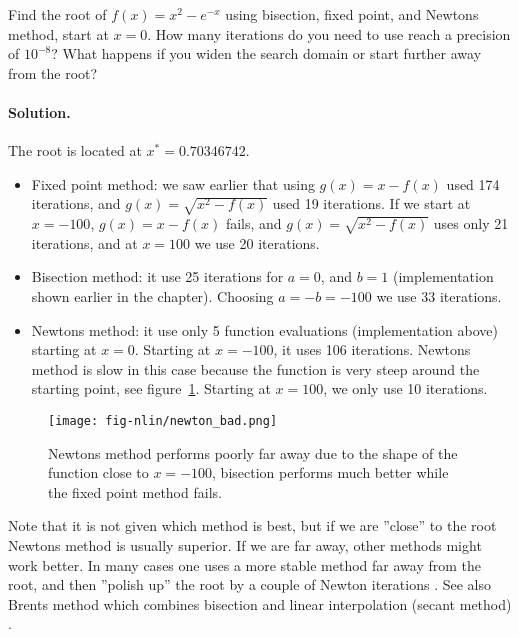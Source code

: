 \documentclass[graybox,sectrefs,envcountresetchap,open=right,final]{svmonodo}
\makeatletter
\newenvironment{graybox2admon}[1][]{
\begin{graybox2mdframed}[frametitle=#1]
}
{
\end{graybox2mdframed}
}
\newenvironment{doconceexercise}{}{}
\newcounter{doconceexercisecounter}%
\newcommand\listofexercises{
\chapter*{List of Exercises
          \@mkboth{List of Exercises}{List of Exercises}}
\markboth{List of Exercises}{List of Exercises}
\@starttoc{loe}
}
\makeatother
\begin{document}
\begin{doconceexercise}

                             

Find the root of $f(x)=x^2-e^{-x}$ using bisection, fixed point,  and Newtons method, start at $x=0$. How many iterations do you need to use reach a precision of $10^{-8}$? What happens if you widen the search domain or start further away from the root?

\paragraph{Solution.}
The root is located at $x^*=0.70346742$.
\begin{itemize}
\item Fixed point method: we saw earlier that using $g(x)=x-f(x)$ used 174 iterations, and $g(x)=\sqrt{x^2-f(x)}$ used 19 iterations. If we start at $x=-100$, $g(x)=x-f(x)$ fails, and  $g(x)=\sqrt{x^2-f(x)}$ uses only 21 iterations, and at $x=100$ we use 20 iterations.

\item Bisection method: it use 25 iterations for $a=0$, and $b=1$ (implementation shown earlier in the chapter). Choosing $a=-b=-100$ we use 33 iterations.

\item Newtons method: it use only 5 function evaluations (implementation above) starting at  $x=0$. Starting at $x=-100$, it uses 106 iterations. Newtons method is slow in this case because the function is very steep around the starting point, see figure~\ref{fig:nlin:newton_bad}. Starting at $x=100$, we only use 10 iterations.
\end{itemize}

\noindent
\begin{figure}[!ht]  %
  \centerline{\texttt{[image: fig-nlin/newton\_bad.png]}}
  \caption{
  Newtons method performs poorly far away due to the shape of the function close to $x=-100$, bisection performs much better while the fixed point method fails. \label{fig:nlin:newton_bad}
  }
\end{figure}



\begin{graybox2admon}[A good starting point is crucial]
Note that it is not given which method is best, but if we are ''close'' to the root Newtons method is usually superior. If we are far away, other methods might work better. In many cases one uses a more stable method far away from the root, and then ''polish up'' the root by a couple of Newton iterations \cite{press2001}. See also Brents method which combines bisection and linear interpolation (secant method) \cite{press2001}.
\end{graybox2admon}





\end{doconceexercise}
\end{document}
